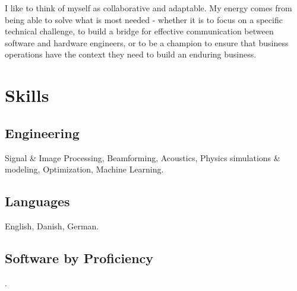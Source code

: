 \documentclass[8pt]{mofiicv}
\begin{document}
\begin{minipage}[T]{\FirstColumnWidth}
	I like to think of myself as collaborative and adaptable. My energy comes from being able to solve what is most needed - whether it is to focus on a specific technical challenge, to build a bridge for effective communication between software and hardware engineers, or to be a champion to ensure that business operations have the context they need to build an enduring business. 

	\vspace*{2em}
	\section{Skills}
	\subsection{Engineering} Signal \& Image Processing, Beamforming, Acoustics, Physics simulations \& modeling, Optimization, Machine Learning.
	\subsection{Languages} English, Danish, German. 

	\subsection{Software by Proficiency}
	\textcolor{sand2}{.}%
	\null\vspace*{1\baselineskip}
	\begin{barchart}{4}
	\end{barchart}
	\end{minipage}
	\hspace*{\ColSep}
\end{document}
